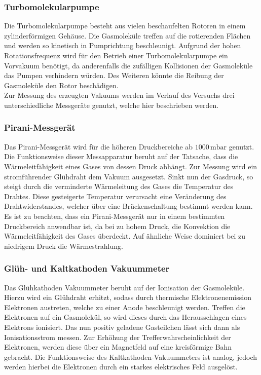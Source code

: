 \subsubsection{Turbomolekularpumpe}
Die Turbomolekularpumpe besteht aus vielen beschaufelten Rotoren in einem zylinderförmigen Gehäuse. Die Gasmoleküle treffen auf die rotierenden Flächen und werden so kinetisch in Pumprichtung beschleunigt.
Aufgrund der hohen Rotationsfrequenz wird für den Betrieb einer Turbomolekularpumpe ein Vorvakuum benötigt, da anderenfalls die zufälligen Kollisionen der Gasmoleküle das Pumpen verhindern würden. Des Weiteren
könnte die Reibung der Gasmoleküle den Rotor beschädigen.
\\Zur Messung des erzeugten Vakuums werden im Verlauf des Versuchs drei unterschiedliche Messgeräte genutzt, welche hier beschrieben werden.
\subsubsection{Pirani-Messgerät}
Das Pirani-Messgerät wird für die höheren Druckbereiche ab $1000 \,\si{\milli\bar}$ genutzt. Die Funktionsweise dieser Messapparatur beruht auf der Tatsache, dass die Wärmeleitfähigkeit eines Gases von
dessen Druck abhängt. Zur Messung wird ein stromführender Glühdraht dem Vakuum ausgesetzt. Sinkt nun der Gasdruck, so steigt durch die verminderte Wärmeleitung des Gases die Temperatur des Drahtes.
Diese gesteigerte Temperatur verursacht eine Veränderung des Drahtwiderstandes, welcher über eine Brückenschaltung bestimmt werden kann. Es ist zu beachten, dass ein Pirani-Messgerät nur in einem
bestimmten Druckbereich anwendbar ist, da bei zu hohem Druck, die Konvektion die Wärmeleitfähigkeit des Gases überdeckt. Auf ähnliche Weise dominiert bei zu niedrigem Druck die Wärmestrahlung.
\subsubsection{Glüh- und Kaltkathoden Vakuummeter}
Das Glühkathoden Vakuummeter beruht auf der Ionisation der Gasmoleküle. Hierzu wird ein Glühdraht erhitzt, sodass durch thermische Elektronenemission Elektronen austreten, welche zu einer Anode
beschleunigt werden. Treffen die Elektronen auf ein Gasmolekül, so wird dieses durch das Herausschlagen eines Elektrons ionisiert. Das nun positiv geladene Gasteilchen lässt sich dann als
Ionisationsstrom messen. Zur Erhöhung der Trefferwahrscheinlichkeit der Elektronen, werden diese über ein Magnetfeld auf eine kreisförmige Bahn gebracht. Die Funktionsweise des Kaltkathoden-Vakuummeters
ist analog, jedoch werden hierbei die Elektronen durch ein starkes elektrisches Feld ausgelöst.
\newpage
